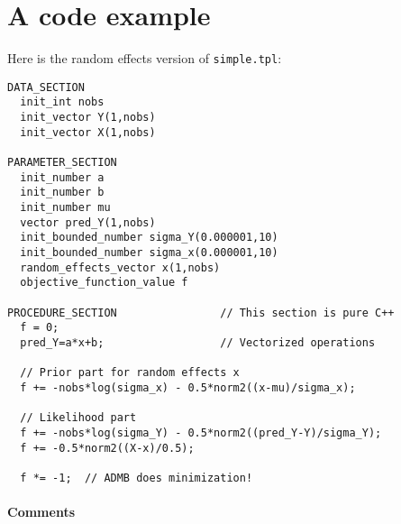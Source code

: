\documentclass{admbmanual}
\begin{document}
\section{A code example\label{sec:code example}}

Here is the random effects version of \texttt{simple.tpl}:
\begin{lstlisting}
DATA_SECTION
  init_int nobs
  init_vector Y(1,nobs)
  init_vector X(1,nobs)

PARAMETER_SECTION
  init_number a
  init_number b
  init_number mu
  vector pred_Y(1,nobs)
  init_bounded_number sigma_Y(0.000001,10)
  init_bounded_number sigma_x(0.000001,10)
  random_effects_vector x(1,nobs)
  objective_function_value f

PROCEDURE_SECTION                // This section is pure C++
  f = 0;
  pred_Y=a*x+b;                  // Vectorized operations

  // Prior part for random effects x
  f += -nobs*log(sigma_x) - 0.5*norm2((x-mu)/sigma_x);

  // Likelihood part
  f += -nobs*log(sigma_Y) - 0.5*norm2((pred_Y-Y)/sigma_Y);
  f += -0.5*norm2((X-x)/0.5);

  f *= -1;  // ADMB does minimization!
\end{lstlisting}

\paragraph{Comments}
\end{document}
